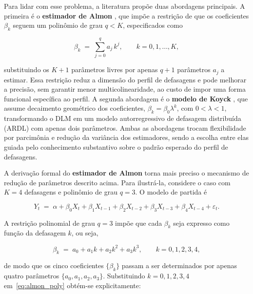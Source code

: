 Para lidar com esse problema, a literatura propõe duas abordagens principais. A primeira é o
\textbf{estimador de Almon} \citep{almon1965}, que impõe a restrição de que os coeficientes
$\beta_k$ seguem um polinômio de grau $q < K$, especificados como 

\begin{equation}
    \beta_k \;=\; \sum_{j=0}^{q} a_j\, k^j, \qquad k = 0, 1, \ldots, K,
    \label{eq:almon}
\end{equation}

\noindent substituindo os $K+1$ parâmetros livres por apenas $q+1$ parâmetros $a_j$ a estimar.
Essa restrição reduz a dimensão do perfil de defasagens e pode melhorar a precisão, sem garantir menor multicolinearidade,
ao custo de impor uma forma funcional específica ao perfil. A segunda abordagem é o
\textbf{modelo de Koyck} \citep{koyck1954}, que assume decaimento geométrico dos coeficientes, $\beta_k = \beta_0 \lambda^k$, com $0 < \lambda < 1$, transformando o DLM em um
modelo autorregressivo de defasagem distribuída (ARDL) com apenas dois parâmetros.
Ambas as abordagens trocam flexibilidade por parcimônia e redução da variância dos
estimadores, sendo a escolha entre elas guiada pelo conhecimento substantivo sobre o
padrão esperado do perfil de defasagens.

A derivação formal do \textbf{estimador de Almon} torna mais preciso o
mecanismo de redução de parâmetros descrito acima. Para ilustrá-la,
considere o caso com $K = 4$ defasagens e polinômio de grau $q = 3$.
O modelo de partida é
 
\begin{equation}
    Y_t \;=\; \alpha
             + \beta_0 X_t
             + \beta_1 X_{t-1}
             + \beta_2 X_{t-2}
             + \beta_3 X_{t-3}
             + \beta_4 X_{t-4}
             + \varepsilon_t.
    \label{eq:dlm_k4_almon}
\end{equation}
 
A restrição polinomial de grau $q = 3$ impõe que cada $\beta_k$ seja
expresso como função da defasagem $k$, ou seja, 
 
\begin{equation}
    \beta_k \;=\; a_0 + a_1 k + a_2 k^2 + a_3 k^3,
    \qquad k = 0,1,2,3,4,
    \label{eq:almon_poly}
\end{equation}

\noindent de modo que os cinco coeficientes $\{\beta_k\}$ passam a ser
determinados por apenas quatro parâmetros $\{a_0, a_1, a_2, a_3\}$.
Substituindo $k = 0, 1, 2, 3, 4$ em~\eqref{eq:almon_poly}
obtém-se explicitamente:
 
